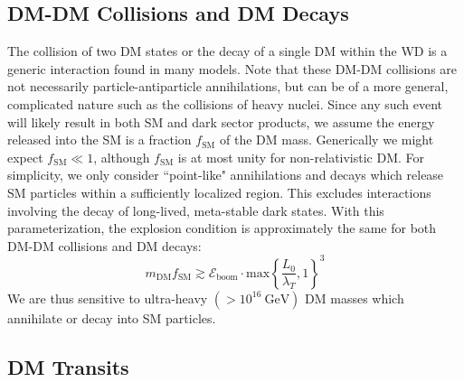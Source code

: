 \documentclass[twocolumn,preprintnumbers,amsmath,amssymb,prl, superscriptaddress]{revtex4}
\newcommand{\Eboom}{\mathcal{E}_\text{boom}}
\newcommand{\GeV}{\text{GeV}}
\begin{document}
\subsection{DM-DM Collisions and DM Decays}
\label{sec:DMcoldecay}

The collision of two DM states or the decay of a single DM within the WD is a generic interaction found in many models.
Note that these DM-DM collisions are not necessarily particle-antiparticle annihilations, but can be of a more general, complicated nature such as the collisions of heavy nuclei.
Since any such event will likely result in both SM and dark sector products, we assume the energy released into the SM is a fraction $f_\text{SM}$ of the DM mass.
Generically we might expect $f_\text{SM} \ll 1$, although $f_\text{SM}$ is at most unity for non-relativistic DM.
For simplicity, we only consider ``point-like" annihilations and decays which release SM particles within a sufficiently localized region.
This excludes interactions involving the decay of long-lived, meta-stable dark states.
With this parameterization, the explosion condition is approximately the same for both DM-DM collisions and DM decays:
\begin{equation}
\label{eq:coldecay}
  m_\text{DM} f_\text{SM}  \gtrsim \Eboom \cdot \text{max} \left \{\frac{L_0}{\lambda_T}, 1 \right \}^3
\end{equation}
We are thus sensitive to ultra-heavy $(> 10^{16} ~\GeV)$ DM masses which annihilate or decay into SM particles.

\subsection{DM Transits}
\label{sec:DMdecay}
\end{document}
